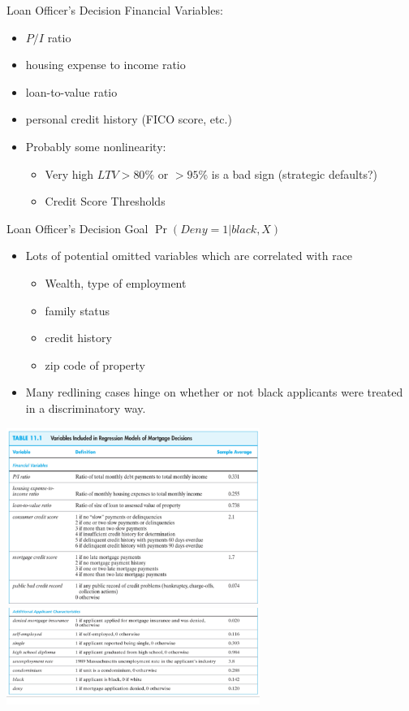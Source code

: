 \documentclass[aspectratio=169,11pt]{beamer}
\begin{document}
\begin{frame}{Loan Officer's Decision}
Financial Variables:
\begin{itemize}
\item $P/I$ ratio
\item housing expense to income ratio
\item loan-to-value ratio
\item personal credit history (FICO score, etc.)
\item Probably some nonlinearity:
\begin{itemize}
\item Very high $LTV > 80\%$ or $>95\%$ is a bad sign (strategic defaults?)
\item Credit Score Thresholds
\end{itemize}
\end{itemize}
\end{frame}


\begin{frame}{Loan Officer's Decision}
Goal $\Pr(Deny=1 | black, X)$\\

\begin{itemize}
\item Lots of potential \alert{omitted variables} which are correlated with race
\begin{itemize}
\item Wealth, type of employment
\item family status
\item credit history
\item zip code of property
\end{itemize}
\item Many \alert{redlining} cases hinge on whether or not black applicants were treated in a discriminatory way.
\end{itemize}
\end{frame}

\begin{frame}
\begin{center}
\includegraphics[width=3.25in]{resources/hmda1.pdf}\\
\includegraphics[width=3.25in]{resources/hmda2.pdf}
\end{center}
\end{frame}
\end{document}
